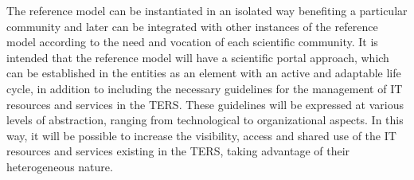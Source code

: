 The reference model can be instantiated in an isolated way benefiting a particular community and later can be integrated with other instances of the reference model according to the need and vocation of each scientific community. It is intended that the reference model will have a scientific portal approach, which can be established in the entities as an element with an active and adaptable life cycle, in addition to including the necessary guidelines for the management of \acrshort{IT} resources and services in the \acrshort{TERS}. These guidelines will be expressed at various levels of abstraction, ranging from technological to organizational aspects. In this way, it will be possible to increase the visibility, access and shared use of the \acrshort{IT} resources and services existing in the \acrshort{TERS}, taking advantage of their heterogeneous nature.\\

